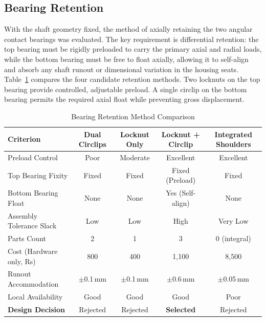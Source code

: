 \subsection{Bearing Retention}

With the shaft geometry fixed, the method of axially retaining the two 
angular contact bearings was evaluated. The key requirement is 
differential retention: the top bearing must be rigidly preloaded to 
carry the primary axial and radial loads, while the bottom bearing must 
be free to float axially, allowing it to self-align and absorb any shaft 
runout or dimensional variation in the housing seats. 
Table~\ref{tab:yaw_retention} compares the four candidate retention 
methods. Two locknuts on the top bearing provide controlled, adjustable 
preload. A single circlip on the bottom bearing permits the required 
axial float while preventing gross displacement.

\begin{table}[htbp]
    \centering
    \footnotesize
    \caption{Bearing Retention Method Comparison}
    \label{tab:yaw_retention}
    \begin{tabular}{l c c c c}
        \toprule
        \textbf{Criterion} & \textbf{Dual Circlips} & \textbf{Locknut Only} 
                           & \textbf{Locknut + Circlip} & \textbf{Integrated Shoulders} \\
                           \midrule
        Preload Control & Poor & Moderate & Excellent & Excellent \\
        Top Bearing Fixity & Fixed & Fixed & Fixed (Preload) & Fixed \\
        Bottom Bearing Float & None & None & Yes (Self-align) & None \\
        Assembly Tolerance Slack & Low & Low & High & Very Low \\
        Parts Count & 2 & 1 & 3 & 0 (integral) \\
        Cost (Hardware only, Rs) & 800 & 400 & 1,100 & 8,500 \\
        Runout Accommodation & \(\pm\)0.1\,mm & \(\pm\)0.1\,mm 
                             & \(\pm\)0.6\,mm & \(\pm\)0.05\,mm \\
        Local Availability & Good & Good & Good & Poor \\
        \textbf{Design Decision} & Rejected & Rejected & \textbf{Selected} 
                                 & Rejected \\
                                 \bottomrule
    \end{tabular}
\end{table}

